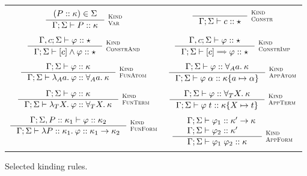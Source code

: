 \documentclass[english, mgr]{iithesis}
\newcommand{\scbrk}[2]{\myatop{\textsc{#1}}{\textsc{#2}}}
\begin{document}
\begin{figure}[htpb]
  \begin{tabularx}{\textwidth}{|CC|}
    \hline & \\
     $\inference{
      (\propv \ofkind \kind) \in  \kEnv
  }{
    \cEnv; \kEnv \vdash \propv \ofkind \kind
  }\:\scbrk{Kind}{Var}
  $ &
     $\inference{
  }{
    \cEnv; \kEnv \vdash \fConstr{\constr} \ofkind \kProp
  }\:\scbrk{Kind}{Constr}
  $ \\ & \\ $
  \inference{
    \cEnv,\constr; \kEnv \vdash \formphi \ofkind \kProp
  }{
    \cEnv; \kEnv \vdash \fCAnd{\constr} \formphi \ofkind \kProp
  }\:\scbrk{Kind}{ConstrAnd}
  $ & $
  \inference{
    \cEnv,\constr; \kEnv \vdash \formphi \ofkind \kProp
  }{
    \cEnv; \kEnv \vdash \fCImp{\constr} \formphi \ofkind \kProp
  }\:\scbrk{Kind}{ConstrImp}$ \\ & \\
    $\inference{
      \cEnv; \kEnv \vdash \formphi \ofkind \kind
    }{
      \cEnv; \kEnv \vdash \fLamAtom{\atomv} \formphi \ofkind \kForallAtom{\atomv}\kind
    }\:\scbrk{Kind}{FunAtom}$
    &
    $\inference{
      \cEnv;\kEnv\vdash \formphi \ofkind \kForallAtom{\atomv}\kind
    }{
      \cEnv;\kEnv\vdash \formphi \fAppAtom{\atomexp} \ofkind \kind \subst{\atomv}{\atomexp}
    }\:\scbrk{Kind}{AppAtom}$
    \\ & \\
    $\inference{
      \cEnv; \kEnv \vdash \formphi \ofkind \kind
    }{
      \cEnv; \kEnv \vdash \fLamTerm{\termv} \formphi \ofkind \kForallTerm{\termv}\kind
    }\:\scbrk{Kind}{FunTerm}$
    &
    $\inference{
      \cEnv;\kEnv\vdash \formphi \ofkind \kForallTerm{\termv}\kind
    }{
      \cEnv;\kEnv\vdash \formphi \fAppTerm{\term} \ofkind \kind\subst{\termv}{\term}
    }\:\scbrk{Kind}{AppTerm}$
    \\ & \\
    $\inference{
      \cEnv; \kEnv, \propv \ofkind \kind_1 \vdash \formphi \ofkind \kind_2
    }{
      \cEnv; \kEnv \vdash \fLamForm{\propv}{\kind_1} \formphi \ofkind \kind_1 \karrow \kind_2
    }\:\scbrk{Kind}{FunForm}$
    &
    $\inference{
      \quad \cEnv; \kEnv \vdash \formphi_1 \ofkind \kind' \karrow \kind
      \\
      \quad \cEnv; \kEnv \vdash \formphi_2 \ofkind \kind' \hfill
    }{
      \cEnv;\kEnv\vdash \formphi_1 \fApp \formphi_2 \ofkind \kind
    }\:\scbrk{Kind}{AppForm}$
    \\ & \\
    \hline
\end{tabularx}
  \caption{Selected kinding rules.}
  \label{fig:kinding}
\end{figure}
\end{document}
